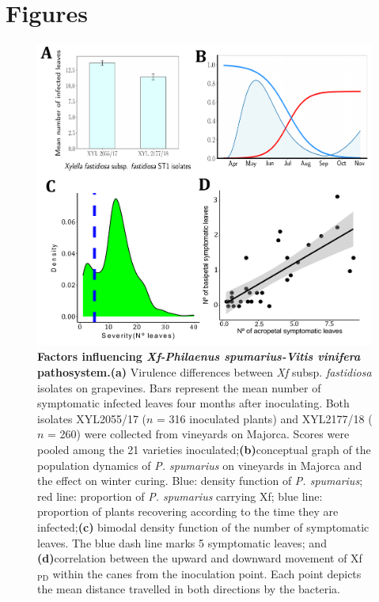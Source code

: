 \newpage

\section{Figures}

\begin{figure}[H]
    \centering
    \includegraphics[width=1\textwidth]{Figures/Fig S1.pdf}
    \caption{\textbf{Factors influencing \textit {Xf-Philaenus
                spumarius-Vitis vinifera} pathosystem.}\textbf{(a)} Virulence
        differences
        between \textit{Xf} subsp. \textit{fastidiosa} isolates on grapevines.
        Bars
        represent the mean number of symptomatic infected leaves four months
        after
        inoculating. Both isolates XYL2055/17 ($n$ = 316 inoculated plants) and
        XYL2177/18 ($n$ = 260) were collected from vineyards on Majorca. Scores
        were
        pooled among the 21 varieties inoculated;\textbf{(b)}conceptual graph
        of the
        population dynamics of \textit{P. spumarius} on vineyards in Majorca
        and the
        effect on winter curing. Blue: density function of \textit{P.
            spumarius}; red
        line: proportion of \textit{P. spumarius} carrying Xf; blue line:
        proportion of
        plants recovering according to the time they are infected;\textbf{(c)}
        bimodal
        density function of the number of symptomatic leaves. The blue dash
        line marks
        5 symptomatic leaves; and \textbf{(d)}correlation between the upward
        and
        downward movement of Xf$_{\textrm{PD}}$ within the canes from the
        inoculation
        point. Each point depicts the mean distance travelled in both
        directions by the
        bacteria.
        \label{figS1}} %
\end{figure}

